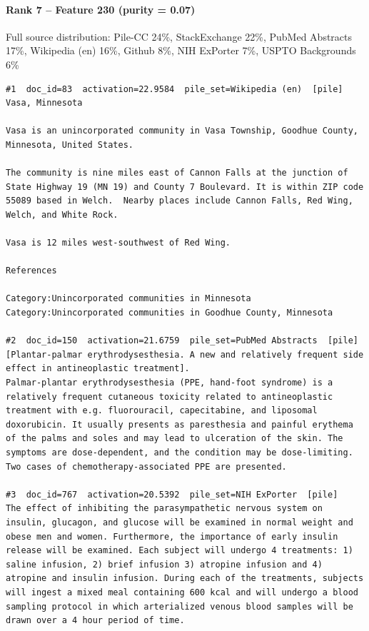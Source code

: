 \paragraph*{Rank 7 -- Feature 230 (purity = 0.07)}

Full source distribution: Pile-CC 24\%, StackExchange 22\%, PubMed Abstracts 17\%, Wikipedia (en) 16\%, Github 8\%, NIH ExPorter 7\%, USPTO Backgrounds 6\%

\begin{verbatim}
#1  doc_id=83  activation=22.9584  pile_set=Wikipedia (en)  [pile]
Vasa, Minnesota

Vasa is an unincorporated community in Vasa Township, Goodhue County, Minnesota, United States.

The community is nine miles east of Cannon Falls at the junction of State Highway 19 (MN 19) and County 7 Boulevard. It is within ZIP code 55089 based in Welch.  Nearby places include Cannon Falls, Red Wing, Welch, and White Rock.

Vasa is 12 miles west-southwest of Red Wing.

References

Category:Unincorporated communities in Minnesota
Category:Unincorporated communities in Goodhue County, Minnesota

#2  doc_id=150  activation=21.6759  pile_set=PubMed Abstracts  [pile]
[Plantar-palmar erythrodysesthesia. A new and relatively frequent side effect in antineoplastic treatment].
Palmar-plantar erythrodysesthesia (PPE, hand-foot syndrome) is a relatively frequent cutaneous toxicity related to antineoplastic treatment with e.g. fluorouracil, capecitabine, and liposomal doxorubicin. It usually presents as paresthesia and painful erythema of the palms and soles and may lead to ulceration of the skin. The symptoms are dose-dependent, and the condition may be dose-limiting. Two cases of chemotherapy-associated PPE are presented.

#3  doc_id=767  activation=20.5392  pile_set=NIH ExPorter  [pile]
The effect of inhibiting the parasympathetic nervous system on insulin, glucagon, and glucose will be examined in normal weight and obese men and women. Furthermore, the importance of early insulin release will be examined. Each subject will undergo 4 treatments: 1) saline infusion, 2) brief infusion 3) atropine infusion and 4) atropine and insulin infusion. During each of the treatments, subjects will ingest a mixed meal containing 600 kcal and will undergo a blood sampling protocol in which arterialized venous blood samples will be drawn over a 4 hour period of time.


\end{verbatim}
